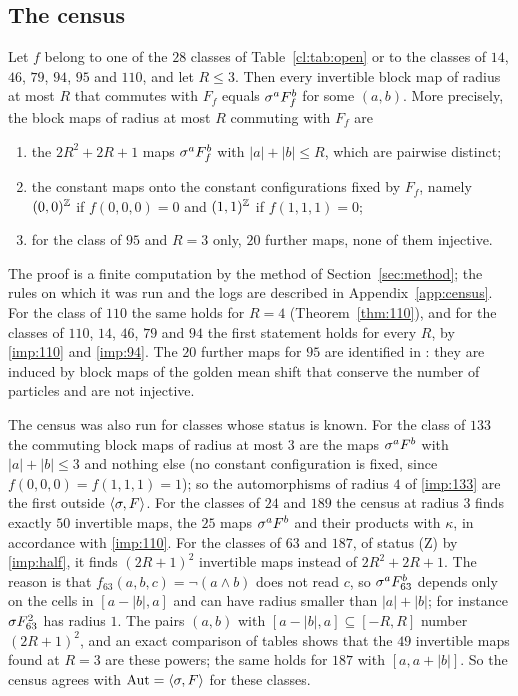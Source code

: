 \subsection{The census}\label{cl:sec:census}

\begin{theorem}\label{cl:thm:census}
Let $f$ belong to one of the $28$ classes of Table~\ref{cl:tab:open} or to the classes of $14$, $46$, $79$, $94$, $95$ and $110$, and let $R\le3$. Then every invertible block map of radius at most $R$ that commutes with $F_f$ equals $\sigma^aF_f^b$ for some $(a,b)$. More precisely, the block maps of radius at most $R$ commuting with $F_f$ are
\begin{enumerate}
\item the $2R^2+2R+1$ maps $\sigma^aF_f^b$ with $|a|+|b|\le R$, which are pairwise distinct;
\item the constant maps onto the constant configurations fixed by $F_f$, namely $(0,0)^{\mathbb{Z}}$ if $f(0,0,0)=0$ and $(1,1)^{\mathbb{Z}}$ if $f(1,1,1)=0$;
\item for the class of $95$ and $R=3$ only, $20$ further maps, none of them injective.
\end{enumerate}
\end{theorem}

The proof is a finite computation by the method of Section~\ref{sec:method}; the rules on which it was run and the logs are described in Appendix~\ref{app:census}. For the class of $110$ the same holds for $R=4$ (Theorem~\ref{thm:110}), and for the classes of $110$, $14$, $46$, $79$ and $94$ the first statement holds for every $R$, by \eqref{imp:110} and \eqref{imp:94}. The $20$ further maps for $95$ are identified in \cite[Proposition~6.21]{PaperE}: they are induced by block maps of the golden mean shift that conserve the number of particles and are not injective.

The census was also run for classes whose status is known. For the class of $133$ the commuting block maps of radius at most $3$ are the maps $\sigma^aF^b$ with $|a|+|b|\le3$ and nothing else (no constant configuration is fixed, since $f(0,0,0)=f(1,1,1)=1$); so the automorphisms of radius $4$ of \eqref{imp:133} are the first outside $\langle\sigma,F\rangle$. For the classes of $24$ and $189$ the census at radius $3$ finds exactly $50$ invertible maps, the $25$ maps $\sigma^aF^b$ and their products with $\kappa$, in accordance with \eqref{imp:110}. For the classes of $63$ and $187$, of status (Z) by \eqref{imp:half}, it finds $(2R+1)^2$ invertible maps instead of $2R^2+2R+1$. The reason is that $f_{63}(a,b,c)=\neg(a\wedge b)$ does not read $c$, so $\sigma^aF_{63}^b$ depends only on the cells in $[a-|b|,a]$ and can have radius smaller than $|a|+|b|$; for instance $\sigma F_{63}^2$ has radius $1$. The pairs $(a,b)$ with $[a-|b|,a]\subseteq[-R,R]$ number $(2R+1)^2$, and an exact comparison of tables shows that the $49$ invertible maps found at $R=3$ are these powers; the same holds for $187$ with $[a,a+|b|]$. So the census agrees with $\operatorname{Aut}=\langle\sigma,F\rangle$ for these classes.

